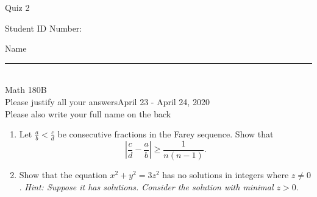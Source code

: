 \documentclass[12pt]{article}
\begin{document}
\begin{flushleft} 
\centerline{\LARGE{Quiz 2}} 
\vspace{5 mm}
{Student ID Number:}\hfill  
{Name \rule {2 in}{0.01in}}\\
Math 180B
\\
{Please justify all your answers}\hfill {April 23 - April 24, 2020}
\\
{Please also write your full name on the back} 

\medskip
\end{flushleft}

\begin{enumerate}
	\item Let $\frac ab < \frac cd$ be consecutive fractions in the Farey sequence. Show that
	\[
	\left|\frac cd - \frac ab \right| \geq \frac{1}{n(n-1)}.
	\]

	\vfill

	\item Show that the equation $x^2 + y^2 = 3z^2$ has no solutions in integers where $z\neq 0$. \textit{Hint: Suppose it has solutions. Consider the solution with minimal $z>0$.}
	\vfill
\end{enumerate}
\end{document}
